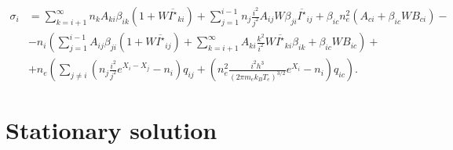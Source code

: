 \documentclass{article}
\begin{document}
\begin{equation}
    \begin{aligned}
        \sigma_i &= \sum\limits_{k=i+1}^\infty n_kA_{ki}\beta_{ik}(1 + W\overline{I^\star}_{ki}) + \sum\limits_{j=1}^{i-1} n_j\frac{i^2}{j^2}A_{ij}W\beta_{ji} \overline{I^\star}_{ij} +\beta_{ic}n_e^2(A_{ci} + \beta_{ic}WB_{ci}) -\\
        &-n_i\left(\sum\limits_{j=1}^{i-1}A_{ij}\beta_{ji}(1 + W\overline{I^\star}_{ij}) + \sum\limits_{k=i+1}^\infty A_{ki}\frac{k^2}{i^2}W\overline{I^\star}_{ki}\beta_{ik}  + \beta_{ic}WB_{ic}\right) +\\
        &+n_e\left(\sum\limits_{j \neq i}\left(n_j\frac{i^2}{j^2}e^{X_i-X_j}-n_i\right)q_{ij}  + \left(n_e^2\frac{i^2h^3}{(2\pi m_ek_BT_e)^{3/2}}e^{X_i}-n_i\right)q_{ic}\right). 
    \end{aligned}
\end{equation}


\section{Stationary solution}
\end{document}
